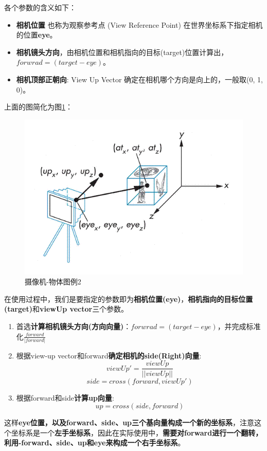 \documentclass[UTF8,a4paper,12pt]{ctexbook}
\begin{document}
				各个参数的含义如下：
				\begin{itemize}[itemindent = 1em]
					\item \textbf{相机位置 }也称为观察参考点 (View Reference Point) 在世界坐标系下指定相机的位置\textbf{eye}。
					\item \textbf{相机镜头方向}，由相机位置和相机指向的目标(target)位置计算出，$forwrad=(target−eye)$。
					\item \textbf{相机顶部正朝向}: View Up Vector 确定在相机哪个方向是向上的，一般取(0, 1, 0)。
				\end{itemize}
				上面的图简化为图\ref{shexiangjie2}： 
				\begin{figure}[H]
					\centering
					\includegraphics[width=.8\linewidth]{EyeTrans2.png}
					\caption{摄像机-物体图例2}
					\label{shexiangjie2}
				\end{figure}
				
				在使用过程中，我们是要指定的参数即为\textbf{相机位置(eye)}，\textbf{相机指向的目标位置(target)}和\textbf{viewUp vector}三个参数。 
				
				\begin{enumerate}[itemindent = 1em]
					\item 首选\textbf{计算相机镜头方向(方向向量)}：$forwrad=(target−eye)$，并完成标准化$\frac{forward}{|forward|}$
					\item 根据view-up vector和forward\textbf{确定相机的side(Right)向量}:
						$$viewUp' = \dfrac{viewUp}{||viewUp||}$$
						$$side = cross(forward, viewUp')$$
					\item 根据forward和side\textbf{计算up向量}: 
						$$up=cross(side,forward)$$
				\end{enumerate}
				
				这样\textbf{eye位置，以及forward、side、up三个基向量构成一个新的坐标系}，注意这个坐标系是一个\textbf{左手坐标系}，因此在实际使用中，\textbf{需要对forward进行一个翻转，利用-forward、side、up和eye来构成一个右手坐标系}。
				
\end{document}

